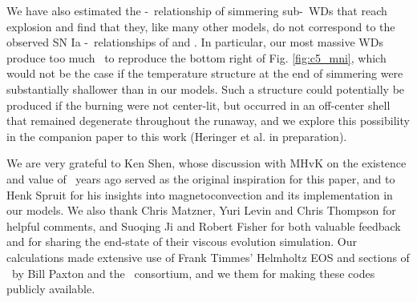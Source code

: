 
We have also estimated the \Mtot-\MNi\ relationship of simmering sub-\Mch\ WDs that reach explosion and find that they, like many other models, do not correspond to the observed SN Ia \Mtot-\MNi\ relationships of \cite{scalzrs14} and \cite{chil+15}.  In particular, our most massive WDs produce too much \Ni\ to reproduce the bottom right of Fig. \ref{fig:c5_mni}, which would not be the case if the temperature structure at the end of simmering were substantially shallower than in our models.  Such a structure could potentially be produced if the burning were not center-lit, but occurred in an off-center shell that remained degenerate throughout the runaway, and we explore this possibility in the companion paper to this work (Heringer et al. in preparation).

\vspace{5mm}

We are very grateful to Ken Shen, whose discussion with MHvK on the existence and value of \Mcrit\ years ago served as the original inspiration for this paper, and to Henk Spruit for his insights into magnetoconvection and its implementation in our models.  We also thank Chris Matzner, Yuri Levin and Chris Thompson for helpful comments, and Suoqing Ji and Robert Fisher for both valuable feedback and for sharing the end-state of their viscous evolution simulation.  Our calculations made extensive use of Frank Timmes' Helmholtz EOS and sections of \mesa\ by Bill Paxton and the \mesa\ consortium, and we them for making these codes publicly available.  



